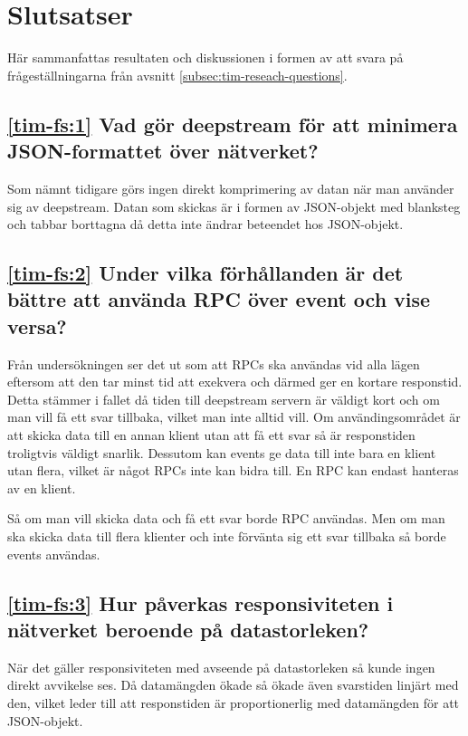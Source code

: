 \section{Slutsatser}
\label{sec:tim-conclusion}
Här sammanfattas resultaten och diskussionen i formen av att svara på frågeställningarna från avsnitt \ref{subsec:tim-reseach-questions}.

\subsection*{\ref{tim-fs:1} Vad gör deepstream för att minimera JSON-formattet över nätverket?}
Som nämnt tidigare görs ingen direkt komprimering av datan när man använder sig av deepstream. Datan som skickas är i formen av JSON-objekt med blanksteg och tabbar borttagna då detta inte ändrar beteendet hos JSON-objekt.

\subsection*{\ref{tim-fs:2} Under vilka förhållanden är det bättre att använda RPC över event och vise versa?}
Från undersökningen ser det ut som att RPCs ska användas vid alla lägen eftersom att den tar minst tid att exekvera och därmed ger en kortare responstid. Detta stämmer i fallet då tiden till deepstream servern är väldigt kort och om man vill få ett svar tillbaka, vilket man inte alltid vill. Om användingsområdet är att skicka data till en annan klient utan att få ett svar så är responstiden troligtvis väldigt snarlik. Dessutom kan events ge data till inte bara en klient utan flera, vilket är något RPCs inte kan bidra till. En RPC kan endast hanteras av en klient.

Så om man vill skicka data och få ett svar borde RPC användas. Men om man ska skicka data till flera klienter och inte förvänta sig ett svar tillbaka så borde events användas.

\subsection*{\ref{tim-fs:3} Hur påverkas responsiviteten i nätverket beroende på datastorleken?}
När det gäller responsiviteten med avseende på datastorleken så kunde ingen direkt avvikelse ses. Då datamängden ökade så ökade även svarstiden linjärt med den, vilket leder till att responstiden är proportionerlig med datamängden för att JSON-objekt.
